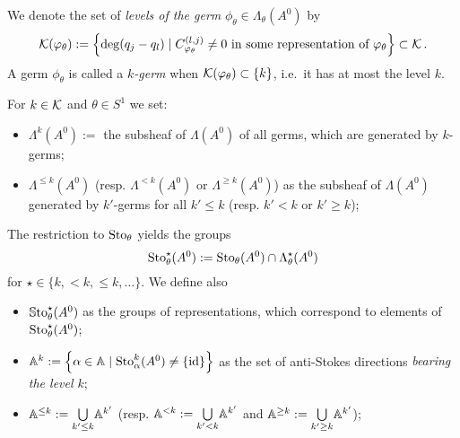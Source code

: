\begin{defn}
  We denote the set of \emph{levels of the germ}
  $\phi_{\theta}\in\Lambda_\theta(A^0)$ by
  \[
    \mathcal{K}(\varphi_\theta):= \left\{\deg(q_j-q_l)\mid C_{\varphi_\theta}^{(l,j)}\neq0
      \text{ in some representation of }\varphi_\theta\right\} \subset \mathcal{K} \,.
  \]
  A germ $\phi_\theta$ is called a \emph{$k$-germ} when
  $\mathcal{K}(\varphi_{\theta})\subset\{k\}$, i.e.\ it has at most the level $k$.
\end{defn}
\begin{notations}
  For $k\in\mathcal{K}$ and $\theta\in S^1$ we set:
  \begin{itemize}
    \item $\Lambda^{k}(A^0):=$ the subsheaf of $\Lambda(A^0)$ of all germs,
      which are generated by $k$-germs;
    \item $\Lambda^{\leq k}(A^0)$ (resp. $\Lambda^{<k}(A^0)$ or
      $\Lambda^{\geq k}(A^0)$) as the subsheaf of $\Lambda(A^0)$ generated by
      $k'$-germs for all $k'\leq k$ (resp. $k'<k$ or $k'\geq k$);
  \end{itemize}
  The restriction to $\operatorname{Sto}_\theta$ yields the groups
  \[
    \operatorname{Sto}_\theta^\star(A^0):=\operatorname{Sto}_\theta(A^0)\cap\Lambda_\theta^{\star}(A^0)
  \]
  for $\star\in\{k,<k,\leq k,\dots\}$.
  We define also
  \begin{itemize}
    \item $\operatorname{\mathbb{S}to}^\star_\theta(A^0)$ as the groups of representations, which
      correspond to elements of  $\operatorname{Sto}^\star_\theta(A^0)$;
    \item $\mathbb{A}^k:=\left\{\alpha\in\mathbb{A}\mid\operatorname{Sto}_\alpha^k(A^0)\neq\{\operatorname{id}\}\right\}$
      as the set of anti-Stokes directions \emph{bearing the level $k$};
    \item $\mathbb{A}^{\leq k}:=\underset{k'\leq k}\bigcup\mathbb{A}^{k'}$ (resp.
      $\mathbb{A}^{<k}:=\underset{k'<k}\bigcup\mathbb{A}^{k'}$ and
      $\mathbb{A}^{\geq k}:=\underset{k'\geq k}\bigcup\mathbb{A}^{k'}$);
      \begin{s-rem}

\end{s-rem}
\end{itemize}
\end{notations}
